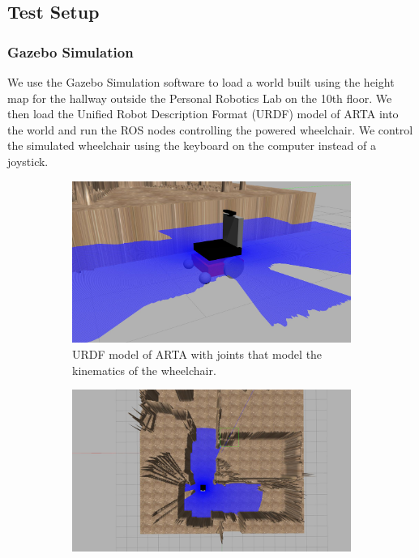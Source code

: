 \subsection{Test Setup}

\subsubsection{Gazebo Simulation}
We use the Gazebo Simulation software to load a world built using the height map for the hallway outside the Personal Robotics Lab on the 10th floor. We then load the Unified Robot Description Format (URDF) model of ARTA into the world and run the ROS nodes controlling the powered wheelchair. We control the simulated wheelchair using the keyboard on the computer instead of a joystick.

\begin{figure}[ht]
    \begin{subfigure}[b]{.48\textwidth}
        \centering
        \includegraphics[width=1.0\linewidth]{img/chapter6_test/artamodel.jpg}
        \caption{URDF model of ARTA with joints that model the kinematics of the wheelchair.}
    \end{subfigure}%
    \hspace{\fill} 
    \begin{subfigure}[b]{.48\textwidth}
        \centering
        \includegraphics[width=1.0\linewidth]{img/chapter6_test/heightmap.jpg}

\end{subfigure}
\end{figure}
